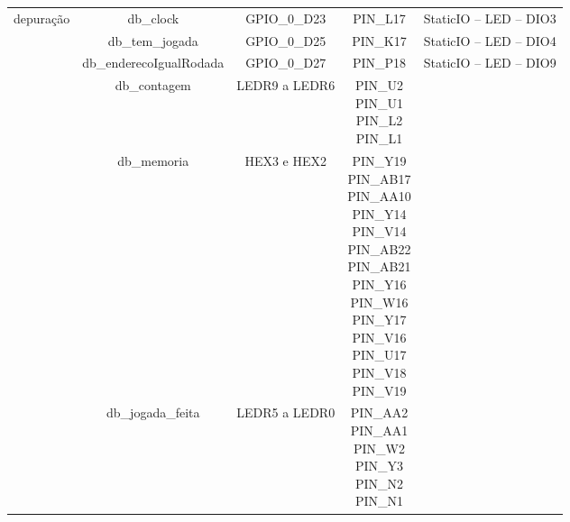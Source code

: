\documentclass[amsmath,amssymb,floatfix]{report}
\begin{document}
\begin{table}[H]
\begin{tabular}{c|c|c|c|c|}
\multicolumn{1}{|c|}{\multirow{41}{*}{depuração}} & db\_clock               & GPIO\_0\_D23         & PIN\_L17                                                                                                                                                                              & StaticIO – LED – DIO3          \\ \cline{2-5} 
\multicolumn{1}{|c|}{}                           & db\_tem\_jogada         & GPIO\_0\_D25         & PIN\_K17                                                                                                                                                                              & StaticIO – LED – DIO4          \\ \cline{2-5} 
\multicolumn{1}{|c|}{}                           & db\_enderecoIgualRodada & GPIO\_0\_D27         & PIN\_P18                                                                                                                                                                              & StaticIO – LED – DIO9          \\ \cline{2-5} 
\multicolumn{1}{|c|}{}                           & db\_contagem            & LEDR9 a LEDR6        & \thead{PIN\_U2\\ PIN\_U1\\ PIN\_L2\\ PIN\_L1}                                                                                                                                         & \multicolumn{1}{l|}{}          \\ \cline{2-5} 
\multicolumn{1}{|c|}{}                           & db\_memoria             & HEX3 e HEX2          & \thead{PIN\_Y19 \\ PIN\_AB17 \\ PIN\_AA10 \\  PIN\_Y14 \\ PIN\_V14 \\  PIN\_AB22 \\  PIN\_AB21 \\PIN\_Y16 \\ PIN\_W16 \\ PIN\_Y17 \\ PIN\_V16 \\ PIN\_U17 \\ PIN\_V18 \\ PIN\_V19 \\} & \multicolumn{1}{l|}{}          \\ \cline{2-5} 
\multicolumn{1}{|c|}{}                           & db\_jogada\_feita       & LEDR5 a LEDR0        & \thead{PIN\_AA2\\ PIN\_AA1\\ PIN\_W2\\ PIN\_Y3\\ PIN\_N2\\ PIN\_N1}                                                                                                                   & \multicolumn{1}{l|}{}          \\ \cline{2-5} 

\end{tabular}
\end{table}
\end{document}
